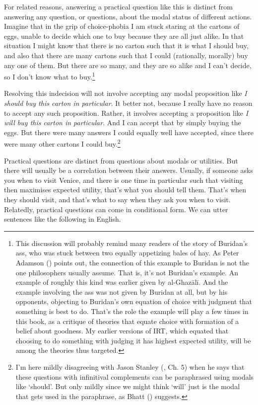 \documentclass[
  12pt,
  letterpaper,
]{scrbook}
\begin{document}
For related reasons, answering a practical question like this is
distinct from answering any question, or questions, about the modal
status of different actions. Imagine that in the grip of choice-phobia I
am stuck staring at the cartons of eggs, unable to decide which one to
buy because they are all just alike. In that situation I might know that
there is no carton such that it is what I should buy, and also that
there are many cartons such that I could (rationally, morally) buy any
one of them. But there are so many, and they are so alike and I can't
decide, so I don't know what to buy.\footnote{This discussion will
  probably remind many readers of the story of Buridan's ass, who was
  stuck between two equally appetizing bales of hay. As Peter Adamson
  () points out, the connection
  of this example to Buridan is not the one philosophers usually assume.
  That is, it's not Buridan's example. An example of roughly this kind
  was earlier given by al-Ghazālī. And the example involving the ass was
  not given by Buridan at all, but by his opponents, objecting to
  Buridan's own equation of choice with judgment that something is best
  to do. That's the role the example will play a few times in this book,
  as a critique of theories that equate choice with formation of a
  belief about goodness. My earlier versions of IRT, which equated that
  choosing to do something with judging it has highest expected utility,
  will be among the theories thus targeted.}

Resolving this indecision will not involve accepting any modal
proposition like \emph{I should buy this carton in particular}. It
better not, because I really have no reason to accept any such
proposition. Rather, it involves accepting a proposition like \emph{I
will buy this carton in particular}. And I can accept that by simply
buying the eggs. But there were many answers I could equally well have
accepted, since there were many other cartons I could buy.\footnote{I'm
  here mildly disagreeing with Jason Stanley
  (, Ch. 5) when he says that these
  questions with infinitival complements can be paraphrased using modals
  like `should'. But only mildly since we might think `will' just is the
  modal that gets used in the paraphrase, as Bhatt
  () suggests.}

Practical questions are distinct from questions about modals or
utilities. But there will usually be a correlation between their
answers. Usually, if someone asks you when to visit Venice, and there is
one time in particular such that visiting then maximises expected
utility, that's what you should tell them. That's when they should
visit, and that's what to say when they ask you when to visit.
Relatedly, practical questions can come in conditional form. We can
utter sentences like the following in English.
\end{document}
